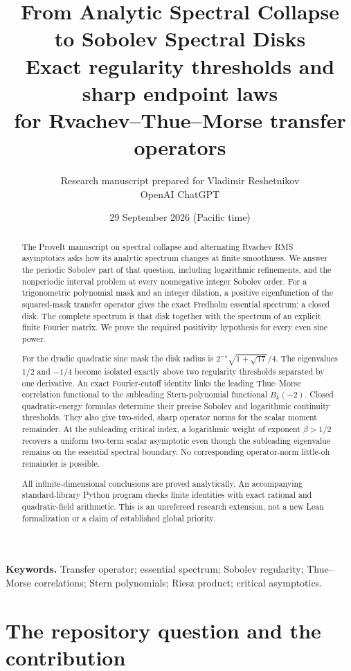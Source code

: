 \documentclass[11pt,a4paper]{article}
\title{\textbf{From Analytic Spectral Collapse\\to Sobolev Spectral Disks}\\[0.6em]
\large Exact regularity thresholds and sharp endpoint laws\\
for Rvachev--Thue--Morse transfer operators}
\author{Research manuscript prepared for Vladimir Reshetnikov\\
\small OpenAI ChatGPT}
\date{29 September 2026 (Pacific time)}
\theoremstyle{definition}
\theoremstyle{remark}
\numberwithin{equation}{section}
\begin{document}
\maketitle
\begin{abstract}
The ProveIt manuscript on spectral collapse and alternating Rvachev RMS
asymptotics asks how its analytic spectrum changes at finite smoothness.
We answer the periodic Sobolev part of that question, including logarithmic
refinements, and the nonperiodic interval problem at every nonnegative integer
Sobolev order. For a trigonometric polynomial mask and an integer dilation,
a positive eigenfunction of the squared-mask transfer operator gives the
exact Fredholm essential spectrum: a closed disk. The complete spectrum is
that disk together with the spectrum of an explicit finite Fourier matrix.
We prove the required positivity hypothesis for every even sine power.

For the dyadic quadratic sine mask the disk radius is
$2^{-s}\sqrt{1+\sqrt{17}}/4$. The eigenvalues $1/2$ and $-1/4$ become isolated
exactly above two regularity thresholds separated by one derivative.
An exact Fourier-cutoff identity links the leading Thue--Morse correlation
functional to the subleading Stern-polynomial functional $B_k(-2)$.
Closed quadratic-energy formulas determine their precise Sobolev and
logarithmic continuity thresholds. They also give two-sided, sharp operator
norms for the scalar moment remainder. At the subleading critical index,
a logarithmic weight of exponent $\beta>1/2$ recovers a uniform two-term
scalar asymptotic even though the subleading eigenvalue remains on the
essential spectral boundary. No corresponding operator-norm little-oh
remainder is possible.

All infinite-dimensional conclusions are proved analytically. An accompanying
standard-library Python program checks finite identities with exact rational
and quadratic-field arithmetic. This is an unrefereed research extension,
not a new Lean formalization or a claim of established global priority.
\end{abstract}
\noindent\textbf{Keywords.} Transfer operator; essential spectrum; Sobolev regularity;
Thue--Morse correlations; Stern polynomials; Riesz product; critical asymptotics.

\clearpage
{\small\setlength{\parskip}{0pt}\tableofcontents}
\clearpage

\section{The repository question and the contribution}
\label{sec:intro}
\end{document}
